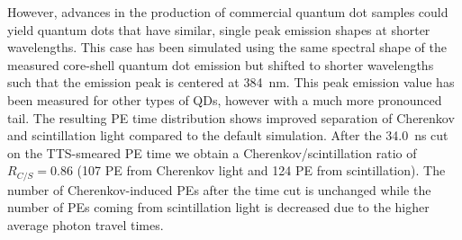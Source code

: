 \documentclass[cits]{JINST}
\begin{document}
However, advances in the production of commercial quantum dot samples
could yield quantum dots that have similar, single peak emission
shapes at shorter wavelengths. This case has been simulated using the
same spectral shape of the measured core-shell quantum dot emission
but shifted to shorter wavelengths such that the emission peak is
centered at 384~nm. This peak emission value has been measured for
other types of QDs, however with a much more pronounced 
tail\cite{qdot2}. The resulting PE time distribution shows improved
separation of Cherenkov and scintillation light compared to the
default simulation. After the 34.0~ns cut on the TTS-smeared PE time
we obtain a Cherenkov/scintillation ratio of $R_{C/S}=0.86$ (107 PE
from Cherenkov light and 124 PE from scintillation). The number of
Cherenkov-induced PEs after the time cut is unchanged while the number
of PEs coming from scintillation light is decreased due to the higher
average photon travel times.
\end{document}
